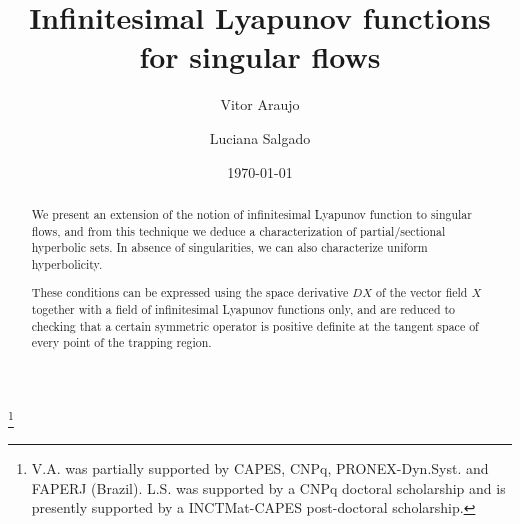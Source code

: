 \documentclass[12pt,reqno]{amsart}
\numberwithin{equation}{section}
\theoremstyle{plain}
\theoremstyle{definition}
\begin{document}
\title%
{Infinitesimal Lyapunov functions for singular flows}



\thanks{
  V.A. was partially supported by CAPES, CNPq,
  PRONEX-Dyn.Syst. and FAPERJ (Brazil). L.S. was supported
  by a CNPq doctoral scholarship and is presently supported
  by a INCTMat-CAPES post-doctoral scholarship.
}


\renewcommand{\subjclassname}{\textup{2000} Mathematics
  Subject Classification}


\author{Vitor Araujo}
\address[V.A.]{Universidade Federal da Bahia,
Instituto de Matem\'atica\\
Av. Adhemar de Barros, S/N , Ondina,
40170-110 - Salvador-BA-Brazil}

\author{Luciana Salgado} \address[L.S.]{ Instituto de
  Matem\'atica Pura e Aplicada - Estrada Dona Castorina,
  110, Jardim Bot\^anico, 22460-320 Rio de Janeiro, Brazil }

\begin{abstract}
  We present an extension of the notion of infinitesimal
  Lyapunov function to singular flows, and from this
  technique we deduce a characterization of partial/sectional
  hyperbolic sets. In absence of singularities, we can also
  characterize uniform hyperbolicity.

These conditions can be expressed using the space
  derivative $DX$ of the vector field $X$ together with a
  field of infinitesimal Lyapunov functions only, and are
  reduced to checking that a certain symmetric operator is
  positive definite at the tangent space of every point of
  the trapping region.
\end{abstract}


\date{\today}

\maketitle
\end{document}
